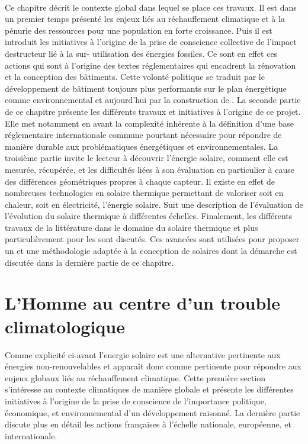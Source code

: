 \paragraph{} %
Ce chapitre décrit le contexte global dans lequel se place ces travaux. Il est dans un
premier temps présenté les enjeux liés au réchauffement climatique et à la pénurie des
ressources pour une population en forte croissance. Puis il est introduit les initiatives
à l’origine de la prise de conscience collective de l’impact destructeur lié à la sur-
utilisation des énergies fossiles. Ce sont en effet ces actions qui sont à l’origine des
textes réglementaires qui encadrent la rénovation et la conception des bâtiments. Cette
volonté politique se traduit par le développement de bâtiment toujours plus performants
sur le plan énergétique comme environnemental et aujourd’hui par la construction de
. La seconde partie de ce chapitre présente les différents travaux et
initiatives à l’origine de ce projet. Elle met notamment en avant la complexité inhérente
à la définition d’une base réglementaire internationale commune pourtant nécessaire pour
répondre de manière durable aux problématiques énergétiques et environnementales. La
troisième partie invite le lecteur à découvrir l’énergie solaire, comment elle est
mesurée, récupérée, et les difficultés liées à son évaluation en particulier à cause des
différences géométriques propres à chaque capteur. Il existe en effet de nombreuses
technologies en solaire thermique permettant de valoriser soit en chaleur, soit en
électricité, l’énergie solaire. Suit une description de l’évaluation de l’évolution du
solaire thermique à différentes échelles. Finalement, les différents travaux de la
littérature dans le domaine du solaire thermique et plus particulièrement pour les
 sont discutés. Ces avancées sont utilisées pour proposer un  et une
méthodologie adaptée à la conception de  solaires dont la démarche
est discutée dans la dernière partie de ce chapitre.



\section{L’Homme au centre d’un trouble climatologique} %
\label{sec:l_homme_au_centre_d_un_trouble_climatologique}
Comme explicité ci-avant l’energie solaire est une alternative pertinente aux énergies
non-renouvelables et apparaît donc comme pertinente pour répondre aux enjeux globaux liés au
réchauffement climatique. Cette première section s’intéresse au contexte climatiques de manière
globale et présente les différentes initiatives à l’origine de la prise de
conscience de l’importance politique, économique, et environnemental d’un développement
raisonné. La dernière partie discute plus en détail les actions françaises à l’échelle
nationale, européenne, et internationale.

